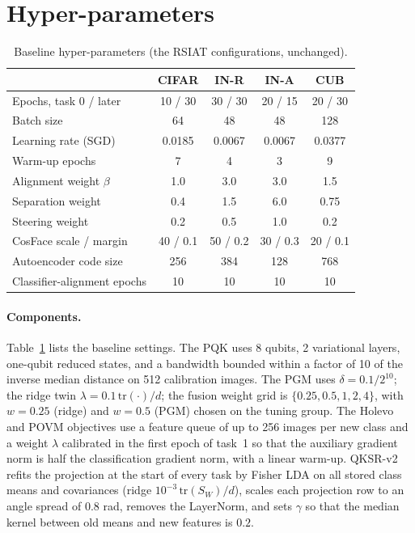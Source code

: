 \section{Hyper-parameters}
\label{app:hyper}

\begin{table}[h]
\centering
\small
\setlength{\tabcolsep}{2.5pt}
\begin{tabular}{lcccc}
\toprule
 & CIFAR & IN-R & IN-A & CUB \\
\midrule
Epochs, task 0 / later & 10 / 30 & 30 / 30 & 20 / 15 & 20 / 30 \\
Batch size & 64 & 48 & 48 & 128 \\
Learning rate (SGD) & 0.0185 & 0.0067 & 0.0067 & 0.0377 \\
Warm-up epochs & 7 & 4 & 3 & 9 \\
Alignment weight $\beta$ & 1.0 & 3.0 & 3.0 & 1.5 \\
Separation weight & 0.4 & 1.5 & 6.0 & 0.75 \\
Steering weight & 0.2 & 0.5 & 1.0 & 0.2 \\
CosFace scale / margin & 40 / 0.1 & 50 / 0.2 & 30 / 0.3 & 20 / 0.1 \\
Autoencoder code size & 256 & 384 & 128 & 768 \\
Classifier-alignment epochs & 10 & 10 & 10 & 10 \\
\bottomrule
\end{tabular}
\caption{Baseline hyper-parameters (the RSIAT configurations, unchanged).}
\label{tab:hyper}
\end{table}

\paragraph{Components.}
Table~\ref{tab:hyper} lists the baseline settings. The PQK uses 8 qubits, 2
variational layers, one-qubit reduced states, and a bandwidth bounded within a
factor of 10 of the inverse median distance on 512 calibration images. The
PGM uses $\delta=0.1/2^{10}$; the ridge twin $\lambda=0.1\,\mathrm{tr}(\cdot)/d$; the
fusion weight grid is $\{0.25,0.5,1,2,4\}$, with $w=0.25$ (ridge) and $w=0.5$
(PGM) chosen on the tuning group. The Holevo and POVM objectives use a feature
queue of up to 256 images per new class and a weight $\lambda$ calibrated in
the first epoch of task~1 so that the auxiliary gradient norm is half the
classification gradient norm, with a linear warm-up. QKSR-v2 refits the
projection at the start of every task by Fisher LDA on all stored class means
and covariances (ridge $10^{-3}\,\mathrm{tr}(S_W)/d$), scales each projection
row to an angle spread of $0.8$ rad, removes the LayerNorm, and sets $\gamma$ so
that the median kernel between old means and new features is $0.2$.

